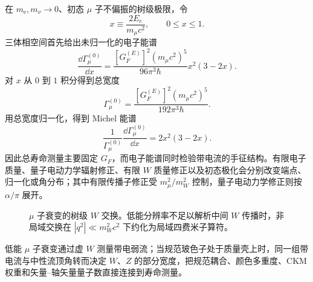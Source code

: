 在 $m_{\mathrm e},m_\nu\to0$、初态 $\mu$ 子不偏振的树级极限，令
\begin{equation*}
 x\equiv\frac{2E_e}{m_\mu c^2},\qquad 0\le x\le1.
\end{equation*}
三体相空间首先给出未归一化的电子能谱
\begin{equation}
 \boxed{
 \frac{\dd\Gamma_\mu^{(0)}}{\dd x}
 =\frac{[G_F^{(E)}]^2(m_\mu c^2)^5}{96\pi^3\hbar}
 x^2(3-2x).}
 \label{eq:muon-differential-tree-dp73}
\end{equation}
对 $x$ 从 $0$ 到 $1$ 积分得到总宽度
\begin{equation}
 \boxed{
 \Gamma_\mu^{(0)}
 =\frac{[G_F^{(E)}]^2(m_\mu c^2)^5}{192\pi^3\hbar}.}
 \label{eq:muon-lifetime-tree-dp11}
\end{equation}
用总宽度归一化，得到 Michel 能谱
\begin{equation}
 \boxed{
 \frac{1}{\Gamma_\mu^{(0)}}\frac{\dd\Gamma_\mu^{(0)}}{\dd x}
 =2x^2(3-2x).}
 \label{eq:muon-michel-spectrum-dp32}
\end{equation}
因此总寿命测量主要固定 $G_F$，而电子能谱同时检验带电流的手征结构。有限电子质量、量子电动力学辐射修正、有限 $W$ 质量修正以及初态极化会分别改变端点、归一化或角分布；其中有限传播子修正受 $m_\mu^2/m_W^2$ 控制，量子电动力学修正则按 $\alpha/\pi$ 展开。

\begin{figure}[htbp]
\centering
{}
\caption{$\mu$ 子衰变的树级 $W$ 交换。低能分辨率不足以解析中间 $W$ 传播时，非局域交换在 $|q^2|\ll m_W^2c^2$ 下约化为局域四费米子算符。}
\label{fig:muon-w-exchange-dp11}
\end{figure}

低能 $\mu$ 子衰变通过虚 $W$ 测量带电弱流；当规范玻色子处于质量壳上时，同一组带电流与中性流顶角转而决定 $W$、$Z$ 的部分宽度，把规范耦合、颜色多重度、CKM 权重和矢量--轴矢量量子数直接连接到寿命测量。

